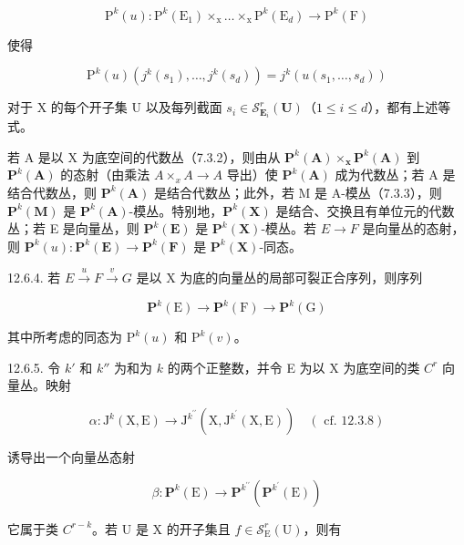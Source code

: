 \[
\mathrm{P} ^ {k} (u) \colon \mathrm{P} ^ {k} (\mathrm{E} _ {1}) \times_ {\mathrm{x}} \dots \times_ {\mathrm{x}} \mathrm{P} ^ {k} (\mathrm{E} _ {d}) \rightarrow \mathrm{P} ^ {k} (\mathrm{F})
\]

使得

\[
\mathrm{P} ^ {k} (u) \left(j ^ {k} \left(s _ {1}\right), \dots , j ^ {k} \left(s _ {d}\right)\right) = j ^ {k} \left(u \left(s _ {1}, \dots , s _ {d}\right)\right)
\]

对于 X 的每个开子集 U 以及每列截面 \(s_i \in \mathcal{S}_{\mathbf{E}_i}^r(\mathbf{U})\)（\(1 \leqslant i \leqslant d\)），都有上述等式。

若 A 是以 X 为底空间的代数丛（7.3.2），则由从 \(\mathbf{P}^{k}(\mathbf{A}) \times_{\mathbf{x}} \mathbf{P}^{k}(\mathbf{A})\) 到 \(\mathbf{P}^{k}(\mathbf{A})\) 的态射（由乘法 \(A \times_{x} A \to A\) 导出）使 \(\mathbf{P}^{k}(\mathbf{A})\) 成为代数丛；若 A 是结合代数丛，则 \(\mathbf{P}^{k}(\mathbf{A})\) 是结合代数丛；此外，若 M 是 A-模丛（7.3.3），则 \(\mathbf{P}^{k}(\mathbf{M})\) 是 \(\mathbf{P}^{k}(\mathbf{A})\)-模丛。特别地，\(\mathbf{P}^{k}(\mathbf{X})\) 是结合、交换且有单位元的代数丛；若 E 是向量丛，则 \(\mathbf{P}^{k}(\mathbf{E})\) 是 \(\mathbf{P}^{k}(\mathbf{X})\)-模丛。若 \(E \to F\) 是向量丛的态射，则 \(\mathbf{P}^{k}(u): \mathbf{P}^{k}(\mathbf{E}) \to \mathbf{P}^{k}(\mathbf{F})\) 是 \(\mathbf{P}^{k}(\mathbf{X})\)-同态。

12.6.4. 若 \(E \xrightarrow{u} F \xrightarrow{v} G\) 是以 X 为底的向量丛的局部可裂正合序列，则序列

\[
\mathbf {P} ^ {k} (\mathrm{E}) \rightarrow \mathbf {P} ^ {k} (\mathrm{F}) \rightarrow \mathbf {P} ^ {k} (\mathrm{G})
\]

其中所考虑的同态为 \(\mathrm{P}^{k}(u)\) 和 \(\mathrm{P}^{k}(v)\)。

12.6.5. 令 \(k'\) 和 \(k''\) 为和为 \(k\) 的两个正整数，并令 E 为以 X 为底空间的类 \(C^{r}\) 向量丛。映射

\[
\alpha \colon \mathrm{J} ^ {k} (\mathrm{X}, \mathrm{E}) \rightarrow \mathrm{J} ^ {k ^ {\prime \prime}} (\mathrm{X}, \mathrm{J} ^ {k ^ {\prime}} (\mathrm{X}, \mathrm{E})) \quad (\text { cf. } 1 2. 3. 8)
\]

诱导出一个向量丛态射

\[
\beta \colon \mathbf {P} ^ {k} (\mathrm{E}) \rightarrow \mathbf {P} ^ {k ^ {\prime \prime}} (\mathbf {P} ^ {k ^ {\prime}} (\mathrm{E}))
\]

它属于类 \(C^{r-k}\)。若 U 是 X 的开子集且 \(f\in\mathcal{S}_{\mathrm{E}}^{r}(\mathrm{U})\)，则有

